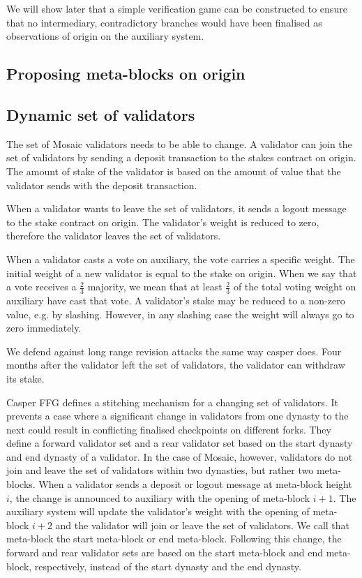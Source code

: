 \documentclass[12pt,a4paper]{article}
\begin{document}
 We will show later that a simple verification game can be constructed to ensure that no intermediary, contradictory branches would have been finalised as observations of origin on the auxiliary system.

\subsection{Proposing meta-blocks on origin}

\subsection{Dynamic set of validators}

The set of Mosaic validators needs to be able to change.
A validator can join the set of validators by sending a deposit transaction to the stakes contract on origin.
The amount of stake of the validator is based on the amount of value that the validator sends with the deposit transaction.

When a validator wants to leave the set of validators, it sends a logout message to the stake contract on origin.
The validator's weight is reduced to zero, therefore the validator leaves the set of validators.

When a validator casts a vote on auxiliary, the vote carries a specific weight.
The initial weight of a new validator is equal to the stake on origin.
When we say that a vote receives a $\frac{2}{3}$ majority, we mean that at least $\frac{2}{3}$ of the total voting weight on auxiliary have cast that vote.
A validator's stake may be reduced to a non-zero value, e.g. by slashing.
However, in any slashing case the weight will always go to zero immediately.

We defend against long range revision attacks the same way casper does.
Four months after the validator left the set of validators, the validator can withdraw its stake.

Casper FFG\cite{casperffg} defines a stitching mechanism for a changing set of validators.
It prevents a case where a significant change in validators from one dynasty to the next could result in conflicting finalised checkpoints on different forks.
They define a forward validator set and a rear validator set based on the start dynasty and end dynasty of a validator.
In the case of Mosaic, however, validators do not join and leave the set of validators within two dynasties, but rather two meta-blocks.
When a validator sends a deposit or logout message at meta-block height $i$, the change is announced to auxiliary with the opening of meta-block $i+1$.
The auxiliary system will update the validator's weight with the opening of meta-block $i+2$ and the validator will join or leave the set of validators. We call that meta-block the start meta-block or end meta-block.
Following this change, the forward and rear validator sets are based on the start meta-block and end meta-block, respectively, instead of the start dynasty and the end dynasty.
\end{document}
